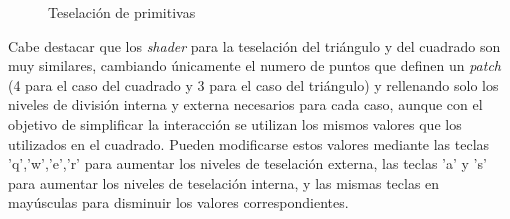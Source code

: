 \documentclass[10pt,oneside,a4paper]{article}
\begin{document}
\begin{figure}[!htb]
\centering
    \qquad
\caption{Teselación de primitivas}
\label{fig:tess1}
\end{figure}

Cabe destacar que los \textit{shader} para la teselación del triángulo y del cuadrado son muy similares, cambiando únicamente el numero de puntos que definen un \textit{patch} (4 para el caso del cuadrado y 3 para el caso del triángulo) y rellenando solo los niveles de división interna y externa necesarios para cada caso, aunque con el objetivo de simplificar la interacción se utilizan los mismos valores que los utilizados en el cuadrado. Pueden modificarse estos valores mediante las teclas 'q','w','e','r' para aumentar los niveles de teselación externa, las teclas 'a' y 's' para aumentar los niveles de teselación interna, y las mismas teclas en mayúsculas para disminuir los valores correspondientes.\\
\end{document}
